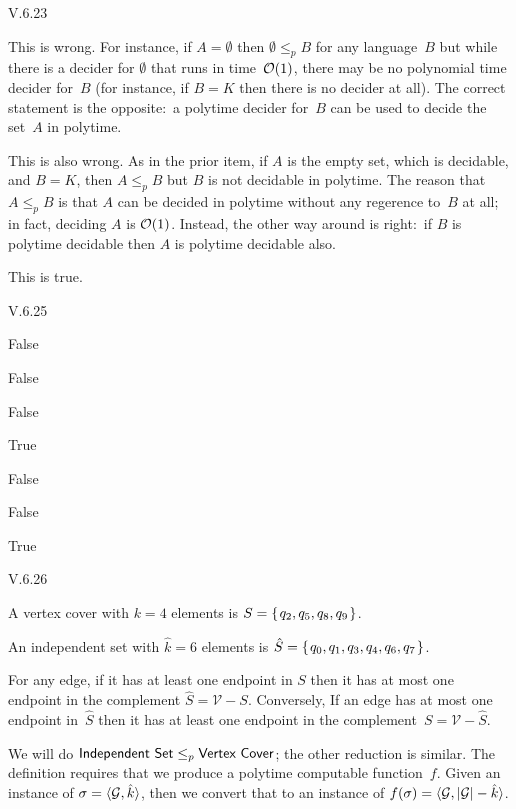 \begin{ans}{V.6.23}
\begin{exparts}
\item This is wrong.
For instance, if $A=\emptyset$ then $\emptyset\leq_p B$ for any language~$B$
but while there is a decider for $\emptyset$ that runs in time~$\operatorname*{\mathcal{O}}(1)$,
there may be no polynomial time decider for~$B$
(for instance, if $B=K$ then there is no decider at all).
The correct statement is the opposite:~a
polytime decider for~$B$ can be used to decide
the set~$A$ in polytime.
\item This is also wrong.
As in the prior item, if $A$ is the empty set, which is decidable,
and $B=K$, then $A\leq_pB$ but $B$ is not decidable in polytime.
The reason that $A\leq_pB$ is that $A$ can be decided in polytime
without any regerence to~$B$ at all; in fact, deciding $A$ is $\operatorname*{\mathcal{O}}(1)$.
Instead, the other way around is right:~if
$B$ is polytime decidable then $A$ is polytime decidable also.
\item This is true.
\end{exparts}
\end{ans}
%
%
\begin{ans}{V.6.25}
\begin{exparts*}
\item
False
\item
False
\item
False
\item
True
\item
False
\item
False
\item
True
\end{exparts*}
\end{ans}
%
\begin{ans}{V.6.26}
\begin{exparts}
\item A vertex cover with $k=4$ elements is $S=\set{q_2,q_5,q_8,q_9}$.
\item An independent set with $\hat{k}=6$ elements is
  $\hat{S}=\set{q_0,q_1,q_3,q_4,q_6,q_7}$.
\item For any edge, if it has at least one endpoint in
$S$ then it has at most one endpoint in the complement $\hat{S}=\mathcal{V}-S$.
Conversely, If an edge has at most one endpoint in~$\hat{S}$
then it has at least one endpoint in the complement~$S=\mathcal{V}-\hat{S}$.
\item We will do $\mbox{\sf Independent Set}\leq_p\mbox{\sf Vertex Cover}$; the
other reduction is similar.
The definition requires that we produce a polytime computable
function~$f$.
Given an instance of 
$\sigma=\langle\mathcal{G},\hat{k}\rangle$,
then we convert that to an instance of  
$f(\sigma)=\langle\mathcal{G},|\mathcal{G}|-\hat{k}\rangle$.
\end{exparts}
\end{ans}
